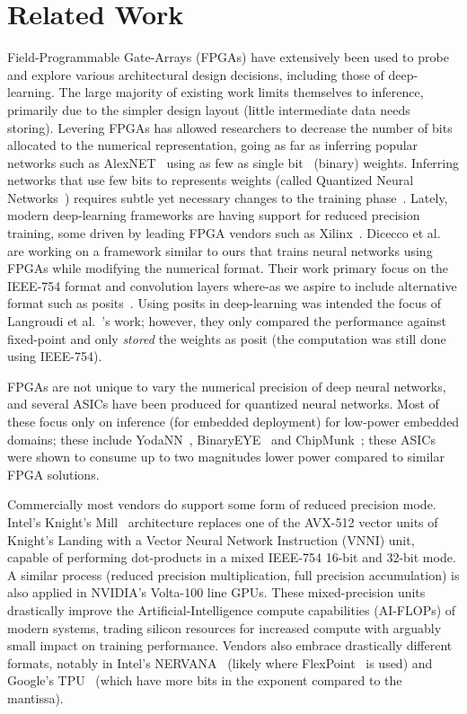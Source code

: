 \documentclass[techrep,english]{ipsj} %
\begin{document}
\section{Related Work}\label{sec:relwork}
Field-Programmable Gate-Arrays (FPGAs) have extensively been used to probe and explore various architectural design decisions, including those of deep-learning.
The large majority of existing work limits themselves to inference, primarily due to the simpler design layout (little intermediate data needs storing).
Levering FPGAs has allowed researchers to decrease the number of bits allocated to the numerical representation, going as far as inferring popular networks such as  AlexNET~\cite{krizhevsky2012imagenet} using as few as single bit~\cite{shimoda2017all,umuroglu2017finn} (binary) weights.
Inferring networks that use few bits to represents weights (called Quantized Neural Networks~\cite{courbariaux2016binarized}) requires subtle yet necessary changes to the training phase~\cite{binaryconnect,courbariaux2016binarized,zhou2016dorefa}.
Lately, modern deep-learning frameworks are having support for reduced precision training, some driven by leading FPGA vendors such as Xilinx~\cite{xilinxml}.
Dicecco et al.~\cite{dicecco2017fpga} are working on a framework similar to ours that trains neural networks using FPGAs while modifying the numerical format.
Their work primary focus on the IEEE-754 format and convolution layers where-as we aspire to include alternative format such as posits~\cite{posits}.
Using posits in deep-learning was intended the focus of Langroudi et al.~\cite{langroudi2018deep}’s work; however, they only compared the performance against fixed-point and only \textit{stored} the weights as posit (the computation was still done using IEEE-754).

FPGAs are not unique to vary the numerical precision of deep neural networks, and several ASICs have been produced for quantized neural networks.
Most of these focus only on inference (for embedded deployment)  for low-power embedded domains; these include YodaNN~\cite{yodann}, BinaryEYE~\cite{binaryeye} and ChipMunk~\cite{chipmunk}; these ASICs were shown to consume up to two magnitudes lower power compared to similar FPGA solutions.

Commercially most vendors do support some form of reduced precision mode.
Intel’s Knight’s Mill~\cite{knm} architecture replaces one of the AVX-512 vector units of Knight’s Landing with a Vector Neural Network Instruction (VNNI) unit, capable of performing dot-products in a mixed IEEE-754 16-bit and 32-bit mode.
A similar process (reduced precision multiplication, full precision accumulation) is also applied in NVIDIA’s Volta-100 line GPUs.
These mixed-precision units drastically improve the Artificial-Intelligence compute capabilities (AI-FLOPs) of modern systems, trading silicon resources for increased compute with arguably small impact on training performance.
Vendors also embrace drastically different formats, notably in Intel’s NERVANA~\cite{nervana} (likely where FlexPoint~\cite{intelflexpoint} is used) and Google’s TPU~\cite{tpuformat} (which have more bits in the exponent compared to the mantissa).
\end{document}
